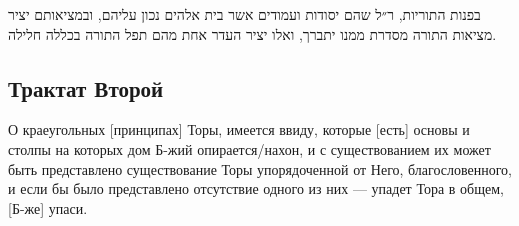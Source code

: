 \documentclass{book}
\begin{document}
\numberlinefalse
\numberpstarttrue 
\sidepstartnumtrue 
\beforeeledchapter

\begin{pairs}
\begin{RTL}%
\begin{hebrew}%
\begin{Rightside} %
\beginnumbering%
\pstart
{}
\pend
\pstart
בפנות התוריות, ר״ל שהם יסודות ועמודים אשר בית אלהים נכון עליהם, ובמציאותם יציר מציאות התורה מסדרת ממנו     יתברך, ואלו יציר העדר אחת מהם תפל התורה בכללה חלילה.
\pend    
\endnumbering%
\end{Rightside}%
\end{hebrew}%
\end{RTL}%


\begin{russian}%
\begin{Leftside} %
\beginnumbering%
\pstart
\chapter{Трактат Второй}   
\pend 
\pstart
О краеугольных [принципах] Торы, имеется ввиду, которые [есть] основы и столпы на которых дом Б-жий опирается/нахон, и с существованием их может быть представлено существование Торы упорядоченной от Него, благословенного, и если бы было представлено отсутствие одного из них — упадет Тора в общем, [Б-же] упаси.
\pend
\endnumbering%
\end{Leftside}%
\end{russian}%



\Columns
\end{pairs}
\end{document}
